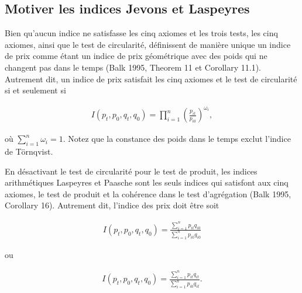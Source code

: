 \documentclass[]{article}
\begin{document}
\hypertarget{motiver-les-indices-jevons-et-laspeyres}{%
\subsection{Motiver les indices Jevons et Laspeyres}\label{motiver-les-indices-jevons-et-laspeyres}}

Bien qu'aucun indice ne satisfasse les cinq axiomes et les trois tests, les cinq axiomes, ainsi que le test de circularité, définissent de manière unique un indice de prix comme étant un indice de prix géométrique avec des poids qui ne changent pas dans le temps (Balk 1995, Theorem 11 et Corollary 11.1). Autrement dit, un indice de prix satisfait les cinq axiomes et le test de circularité si et seulement si

\begin{align*}
I(p_{t}, p_{0}, q_{t}, q_{0}) = \prod_{i = 1}^{n} \left(\frac{p_{it}}{p_{i0} } \right)^{\omega_{i}},
\end{align*}

où \(\sum_{i = 1}^{n} \omega_{i} = 1\). Notez que la constance des poids dans le temps exclut l'indice de Törnqvist.

En désactivant le test de circularité pour le test de produit, les indices arithmétiques Laspeyres et Paasche sont les seuls indices qui satisfont aux cinq axiomes, le test de produit et la cohérence dans le test d'agrégation (Balk 1995, Corollary 16). Autrement dit, l'indice des prix doit être soit

\begin{align*}
I(p_{t}, p_{0}, q_{t}, q_{0}) = \frac{\sum_{i = 1}^{n} p_{it} q_{i0}}{\sum_{i = 1}^{n} p_{i0} q_{i0}}
\end{align*}

ou

\begin{align*}
I(p_{t}, p_{0}, q_{t}, q_{0}) = \frac{\sum_{i = 1}^{n} p_{it} q_{it}}{\sum_{i = 1}^{n} p_{i0} q_{it}}.
\end{align*}
\end{document}

